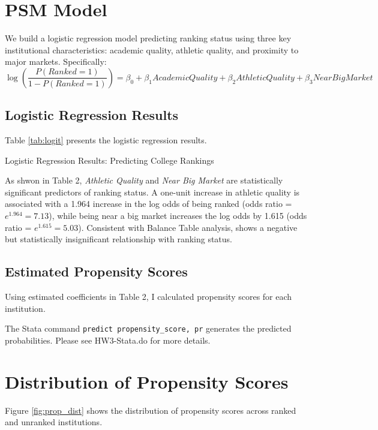 \documentclass[12pt]{article}
\begin{document}
\section{PSM Model}

We build a logistic regression model predicting ranking status using three key institutional characteristics: academic quality, athletic quality, and proximity to major markets. Specifically:
\begin{equation}
\log\left(\frac{P(Ranked = 1)}{1-P(Ranked = 1)}\right) = \beta_0 + \beta_1 AcademicQuality + \beta_2 AthleticQuality + \beta_3 NearBigMarket
\end{equation}

\subsection{Logistic Regression Results}

Table \ref{tab:logit} presents the logistic regression results.

\begin{table}[H]
    \centering
    \caption{Logistic Regression Results: Predicting College Rankings}
    \label{tab:logit}
    
\end{table}

As shwon in Table 2, \textit{Athletic Quality} and \textit{Near Big Market} are statistically significant predictors of ranking status. A one-unit increase in athletic quality is associated with a 1.964 increase in the log odds of being ranked (odds ratio = $e^{1.964} = 7.13$), while being near a big market increases the log odds by 1.615 (odds ratio = $e^{1.615} = 5.03$). Consistent with Balance Table analysis,  shows a negative but statistically insignificant relationship with ranking status.

\subsection{Estimated Propensity Scores}

Using estimated coefficients in Table 2, I calculated propensity scores for each institution. 

The Stata command \texttt{predict propensity\_score, pr} generates the predicted probabilities. Please see HW3-Stata.do for more details.

\section{Distribution of Propensity Scores}
Figure \ref{fig:prop_dist} shows the distribution of propensity scores across ranked and unranked institutions. 
\end{document}
